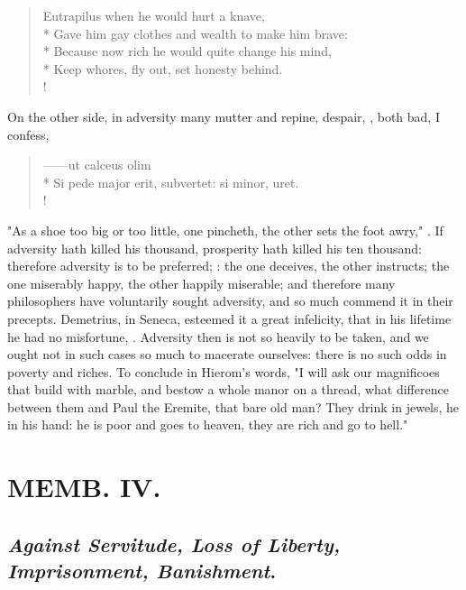 {\begin{verse}%
Eutrapilus when he would hurt a knave,\\*
Gave him gay clothes and wealth to make him brave:\\*
Because now rich he would quite change his mind,\\*
Keep whores, fly out, set honesty behind.\\!
\end{verse}%

On the other side, in adversity many mutter and repine, despair, \etc{}, both bad, I confess,

\begin{latin}
\begin{verse}%
------ut calceus olim\\*
Si pede major erit, subvertet: si minor, uret.\\!
\end{verse}%
\end{latin}



"As a shoe too big or too little, one pincheth, the other sets the foot awry," . If adversity hath killed his thousand, prosperity hath killed his ten thousand: therefore adversity is to be preferred; : the one deceives, the other instructs; the one miserably happy, the other happily miserable; and therefore many philosophers have voluntarily sought adversity, and so much commend it in their precepts. Demetrius, in Seneca, esteemed it a great infelicity, that in his lifetime he had no misfortune, . Adversity then is not so heavily to be taken, and we ought not in such cases so much to macerate ourselves: there is no such odds in poverty and riches. To conclude in Hierom's words, "I will ask our magnificoes that build with marble, and bestow a whole manor on a thread, what difference between them and Paul the Eremite, that bare old man? They drink in jewels, he in his hand: he is poor and goes to heaven, they are rich and go to hell."

\chapter{ MEMB. IV.}


\section{\emph{Against Servitude, Loss of Liberty, Imprisonment, Banishment}.}


}
